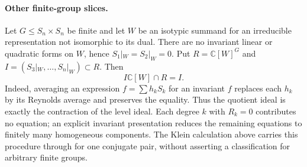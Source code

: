 \paragraph{Other finite-group slices.}
Let $G\leq S_n\times S_n$ be finite and let $W$ be an isotypic summand for an irreducible representation not isomorphic to its dual. There are no invariant linear or quadratic forms on $W$, hence $S_1|_W=S_2|_W=0$. Put
$R=\mathbb C[W]^G$ and
$I=(S_3|_W,\ldots,S_n|_W)\subset R$.
Then
\[
 I\mathbb C[W]\cap R=I.
\]
Indeed, averaging an expression $f=\sum h_kS_k$ for an invariant $f$ replaces each $h_k$ by its Reynolds average and preserves the equality. Thus the quotient ideal is exactly the contraction of the level ideal. Each degree $k$ with $R_k=0$ contributes no equation; an explicit invariant presentation reduces the remaining equations to finitely many homogeneous components. The Klein calculation above carries this procedure through for one conjugate pair, without asserting a classification for arbitrary finite groups.
